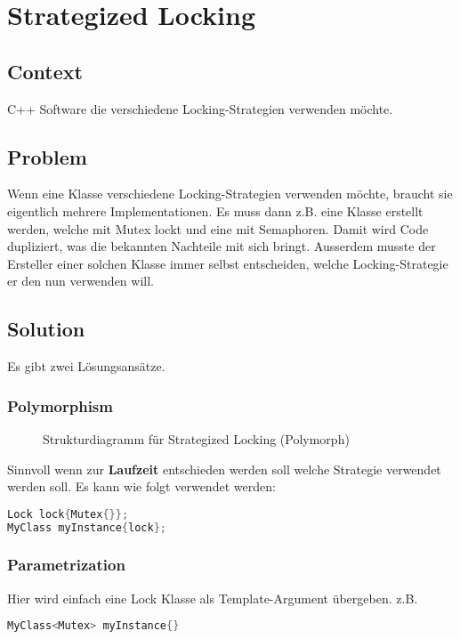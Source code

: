 \chapter{Strategized Locking}

\section{Context}
C++ Software die verschiedene Locking-Strategien verwenden möchte.

\section{Problem}
Wenn eine Klasse verschiedene Locking-Strategien verwenden möchte, braucht sie eigentlich mehrere Implementationen. Es muss dann z.B. eine Klasse erstellt werden, welche mit Mutex lockt und eine mit Semaphoren. Damit wird Code dupliziert, was die bekannten Nachteile mit sich bringt. Ausserdem musste der Ersteller einer solchen Klasse immer selbst entscheiden, welche Locking-Strategie er den nun verwenden will.

\section{Solution}
Es gibt zwei Lösungsansätze.

\subsection{Polymorphism}
\begin{figure}[H]
  \centering
  
  \caption{Strukturdiagramm f\"ur Strategized Locking (Polymorph)}
\end{figure}
Sinnvoll wenn zur \textbf{Laufzeit} entschieden werden soll welche Strategie verwendet werden soll. Es kann wie folgt verwendet werden:
\begin{lstlisting}[language=C++]
Lock lock{Mutex{}};
MyClass myInstance{lock};
\end{lstlisting}

\subsection{Parametrization}
Hier wird einfach eine Lock Klasse als Template-Argument übergeben. z.B.
\begin{lstlisting}[language=C++]
MyClass<Mutex> myInstance{}
\end{lstlisting}

